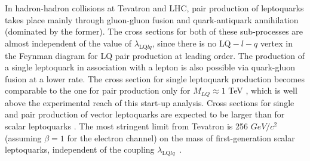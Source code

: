 %


In hadron-hadron collisions at Tevatron and LHC,
pair production of leptoquarks takes place 
mainly through gluon-gluon fusion and 
quark-antiquark annihilation (dominated by the former). 
The cross sections for both of these sub-processes are almost 
independent of the value of 
$\lambda_{\mbox{LQ}lq}$, since there is 
no $\mbox{LQ}-l-q$ vertex in the Feynman diagram for LQ pair production 
at leading order. 
The production of a single leptoquark in association with a lepton 
is also possible via quark-gluon 
fusion at a lower rate. 
The cross section for single leptoquark production
becomes comparable to the one for pair production only 
for $M_{LQ}\approx 1$ TeV \cite{Belyaev:2005ew}, 
which is well above the experimental reach of this start-up analysis.  
Cross sections for single and pair production of vector leptoquarks 
are expected to be larger than for scalar leptoquarks \cite{Belyaev:2005ew}.
The most stringent limit from Tevatron is
256 $GeV/c^2$ (assuming $\beta=1$ for the electron channel) 
on the mass of first-generation scalar leptoquarks,  independent of the
coupling $\lambda_{\mbox{LQ}lq}$~\cite{Abazov:2004mk,Acosta:2005ge}.



